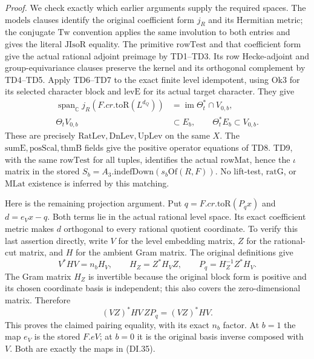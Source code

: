\emph{Proof.}
We check exactly which earlier arguments supply the required spaces.
The \(\mathrm{models}\) clauses identify the original coefficient
form \(j_R\) and its Hermitian metric; the conjugate \(\mathrm{Tw}\)
convention applies the same involution to both entries and gives the
literal \(\mathrm{JIsoR}\) equality. The primitive
\(\mathrm{rowTest}\) and that coefficient form give the actual
rational adjoint preimage by TD1--TD3. Its row Hecke-adjoint and
group-equivariance clauses preserve the kernel and its orthogonal
complement by TD4--TD5. Apply TD6--TD7 to the exact finite level
idempotent, using \(\mathrm{Ok3}\) for its selected character block
and \(\mathrm{levE}\) for its actual target character. They give
\[
\begin{split}
 \operatorname{span}_{\mathbb C}j_R(F.cr.\mathrm{toR}(L^{d_Q}))
       &=\operatorname{im}\Theta_t^*\cap V_{0,b},\\
 \Theta_t V_{0,b}&\subset E_b,\qquad
                       \Theta_t^*E_b\subset V_{0,b}.
\end{split}
 \tag{DI.34}
\]
These are precisely \(\mathrm{RatLev,DnLev,UpLev}\) on the
same \(X\). The \(\mathrm{sumE,posScal,thmB}\) fields give the
positive operator equations of TD8. TD9, with the same
\(\mathrm{rowTest}\) for all tuples, identifies the actual
\(\mathrm{rowMat}\), hence the \(\iota\) matrix in the stored
\(S_b= A_3.\mathrm{indefDown}(s_b\mathrm{Of}(R,F))\).
No lift-test, \(\mathrm{ratG}\), or \(\mathrm{MLat}\) existence
is inferred by this matching.

Here is the remaining projection argument. Put
\(q=F.cr.\mathrm{toR}(P_qx)\) and \(d=e_Vx-q\).
Both terms lie in the actual rational level space. Its exact
coefficient metric makes \(d\) orthogonal to every rational
quotient coordinate. To verify this last assertion directly, write
\(V\) for the level embedding matrix, \(Z\) for the rational-cut
matrix, and \(H\) for the ambient Gram matrix. The original
definitions give
\[
 V^*HV=n_bH_V,\qquad H_Z=Z^*H_VZ,
       \qquad P_q=H_Z^{-1}Z^*H_V.
 \tag{DI.35}
\]
The Gram matrix \(H_Z\) is invertible because the original block
form is positive and its chosen coordinate basis is independent;
this also covers the zero-dimensional matrix. Therefore
\[
       (VZ)^*HV\,ZP_q=(VZ)^*HV.
 \tag{DI.36}
\]
This proves the claimed pairing equality, with its exact \(n_b\)
factor. At \(b=1\) the map \(e_V\) is the stored \(F.eV\); at
\(b=0\) it is the original basis inverse composed with \(V\).
Both are exactly the maps in (DI.35).

